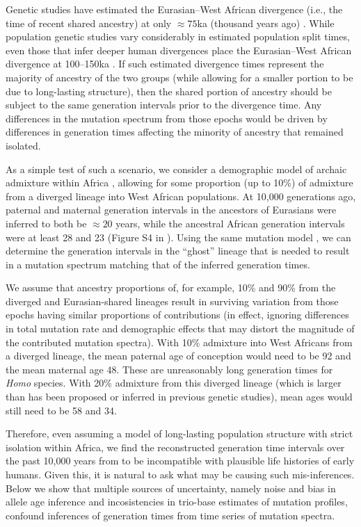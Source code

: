 \documentclass[]{article}
\begin{document}
Genetic studies have estimated the Eurasian--West African divergence (i.e., the
time of recent shared ancestry) at only $\approx 75$ka (thousand years ago)
\citep[e.g.,][]{pagani2015tracing,others}. While population genetic studies
vary considerably in estimated population split times, even those that infer
deeper human divergences place the Eurasian--West African divergence at
100--150ka \citep[e.g.,][]{schlebusch2017southern}. If such estimated
divergence times represent the majority of ancestry of the two groups (while
allowing for a smaller portion to be due to long-lasting structure), then the
shared portion of ancestry should be subject to the same generation intervals
prior to the divergence time. Any differences in the mutation spectrum from
those epochs would be driven by differences in generation times affecting the
minority of ancestry that remained isolated. 

As a simple test of such a scenario, we consider a demographic model of archaic
admixture within Africa \citep[e.g.,][]{durvasula2020recovering}, allowing for
some proportion (up to 10\%) of admixture from a diverged lineage into West
African populations. At 10,000 generations ago, paternal and maternal
generation intervals in the ancestors of Eurasians were inferred to both be
$\approx20$ years, while the ancestral African generation intervals were at
least 28 and 23 (Figure S4 in \citet{wang2023human}). Using the same mutation
model \citep{jonsson2017parental}, we can determine the generation intervals in
the ``ghost'' lineage that is needed to result in a mutation spectrum matching
that of the inferred generation times.

We assume that ancestry proportions of, for example, 10\% and 90\% from the
diverged and Eurasian-shared lineages result in surviving variation from those
epochs having similar proportions of contributions (in effect, ignoring
differences in total mutation rate and demographic effects that may distort
the magnitude of the contributed mutation spectra). With 10\% admixture into
West Africans from a diverged lineage, the mean paternal age of conception
would need to be 92 and the mean maternal age 48. These are unreasonably long
generation times for \emph{Homo} species. With 20\% admixture from this
diverged lineage (which is larger than has been proposed or inferred in
previous genetic studies), mean ages would still need to be 58 and 34.

Therefore, even assuming a model of long-lasting population structure with
strict isolation within Africa, we find the reconstructed generation time
intervals over the past 10,000 years from \citet{wang2023human} to be
incompatible with plausible life histories of early humans. Given this, it is
natural to ask what may be causing such mis-inferences. Below we show that
multiple sources of uncertainty, namely noise and bias in allele age inference
and incosistencies in trio-base estimates of mutation profiles, confound
inferences of generation times from time series of mutation spectra.
\end{document}
